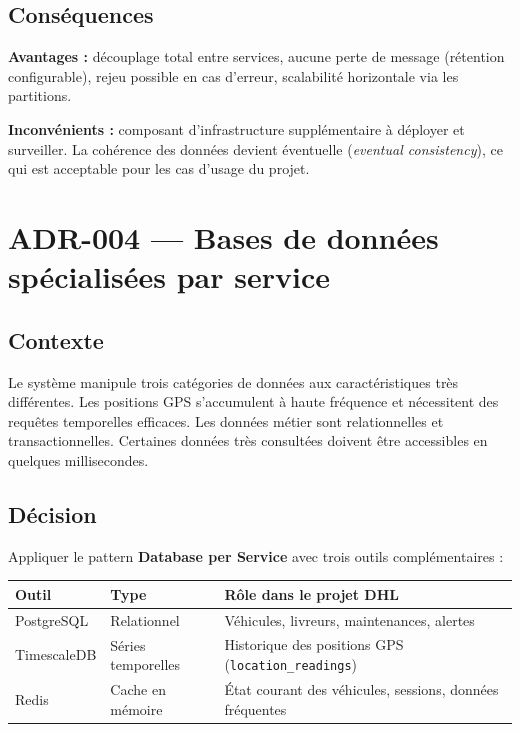 \documentclass[10pt,a4paper]{article}
\begin{document}
\subsection{Conséquences}
\textbf{Avantages :} découplage total entre services, aucune perte de message (rétention configurable), rejeu possible en cas d'erreur, scalabilité horizontale via les partitions.

\noindent\textbf{Inconvénients :} composant d'infrastructure supplémentaire à déployer et surveiller. La cohérence des données devient éventuelle (\textit{eventual consistency}), ce qui est acceptable pour les cas d'usage du projet.

\section{ADR-004 --- Bases de données spécialisées par service}

\subsection{Contexte}
Le système manipule trois catégories de données aux caractéristiques très différentes. Les positions GPS s'accumulent à haute fréquence et nécessitent des requêtes temporelles efficaces. Les données métier sont relationnelles et transactionnelles. Certaines données très consultées doivent être accessibles en quelques millisecondes.

\subsection{Décision}
Appliquer le pattern \textbf{Database per Service} avec trois outils complémentaires :

\vspace{4pt}
\begin{tabularx}{\linewidth}{llX}
  \toprule
  \small\textbf{Outil} & \small\textbf{Type} & \small\textbf{Rôle dans le projet DHL} \\
  \midrule
  PostgreSQL   & Relationnel        & Véhicules, livreurs, maintenances, alertes \\
  TimescaleDB  & Séries temporelles & Historique des positions GPS (\texttt{location\_readings}) \\
  Redis        & Cache en mémoire   & État courant des véhicules, sessions, données fréquentes \\
  \bottomrule
\end{tabularx}
\end{document}
